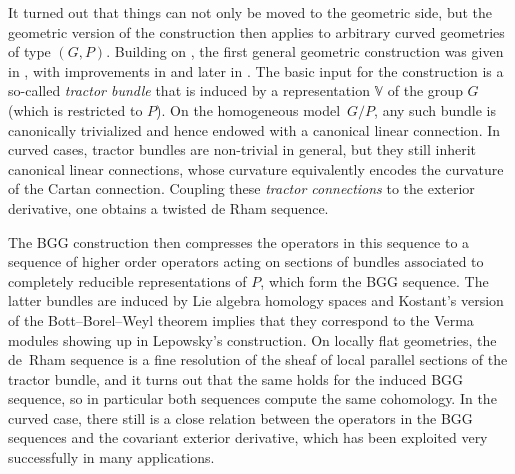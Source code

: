 \documentclass[10pt,a4paper]{amsart}
\numberwithin{equation}{section}
\def\Bbb{\mathbb}
\begin{document}
It turned out that things can not only be moved to the geometric side, but the
geometric version of the construction then applies to arbitrary curved geometries of
type $(G,P)$. Building on \cite{Baston}, the first general geometric construction was
given in \cite{CSS-BGG}, with improvements in \cite{Calderbank-Diemer} and later in
\cite{Rel-BGG2}. The basic input for the construction is a so-called \textit{tractor
 bundle} that is induced by a representation $\Bbb V$ of the group $G$ (which is
restricted to $P$). On the homogeneous model~$G/P$, any such bundle is canonically
trivialized and hence endowed with a canonical linear connection. In curved cases,
tractor bundles are non-trivial in general, but they still inherit canonical
linear connections, whose curvature equivalently encodes the curvature of the Cartan
connection. Coupling these \textit{tractor connections} to the exterior derivative,
one obtains a twisted de Rham sequence.

The BGG construction then compresses the operators in this sequence to a sequence of
higher order operators acting on sections of bundles associated to completely
reducible representations of $P$, which form the BGG sequence. The latter bundles are
induced by Lie algebra homology spaces and Kostant's version of the Bott--Borel--Weyl
theorem \cite{Kostant} implies that they correspond to the Verma modules showing up
in Lepowsky's construction. On locally flat geometries, the de~Rham sequence is a
fine resolution of the sheaf of local parallel sections of the tractor bundle, and it
turns out that the same holds for the induced BGG sequence, so in particular both
sequences compute the same cohomology. In the curved case, there still is a close
relation between the operators in the BGG sequences and the covariant exterior
derivative, which has been exploited very successfully in many applications.
\end{document}
